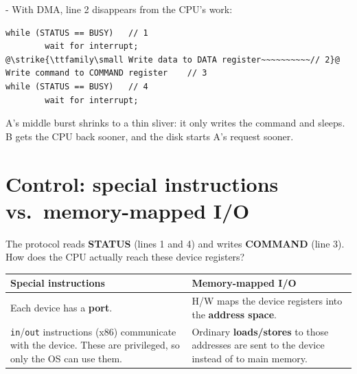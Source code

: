 \documentclass[11pt,a4paper]{article}
\makeatletter
\newcommand{\strike}[1]{\tikz[baseline=(t.base)]{\node[inner sep=0pt] (t) {#1}; \draw[thick] (t.west) -- (t.east);}}
\newcommand{\keepspace}[1]{\par\penalty-100\begingroup
  \setlength{\dimen@}{#1}\dimen@ii\pagegoal\advance\dimen@ii-\pagetotal
  \ifdim\dimen@>\dimen@ii\ifdim\dimen@ii>\z@\vfil\fi\break\fi\endgroup}
\newcommand{\seg}[6]{%
  \draw[fill=#5] (#2,#1) rectangle (#3,{#1+0.45});
  \node[font=\small\bfseries, text=#6] at ({(#2+#3)/2},{#1+0.225}) {#4};}
\newcommand{\rows}[1]{%
  \node[anchor=east, font=\small\bfseries] at (-0.15,0.975) {CPU:};
  \node[anchor=east, font=\small\bfseries] at (-0.15,0.225) {Disk:};
  \draw[-{Latex}, g3] (0,-0.35) -- (#1,-0.35) node[right, font=\scriptsize] {time};}
\newcommand{\A}{g3}\newcommand{\B}{g1}\newcommand{\C}{black!85}
\makeatother
\begin{document}
\keepspace{9\baselineskip}
With DMA, line 2 disappears from the CPU's work:

\begin{lstlisting}[escapechar=@]
while (STATUS == BUSY)   // 1
        wait for interrupt;
@\strike{\ttfamily\small Write data to DATA register~~~~~~~~~~// 2}@
Write command to COMMAND register    // 3
while (STATUS == BUSY)   // 4
        wait for interrupt;
\end{lstlisting}

\begin{center}
\end{center}

A's middle burst shrinks to a thin sliver: it only writes the command and
sleeps. B gets the CPU back sooner, and the disk starts A's request
sooner.

\section{Control: special instructions vs.\ memory-mapped I/O}

\begin{quizbox}
The protocol reads \textbf{STATUS} (lines 1 and 4) and writes
\textbf{COMMAND} (line 3). How does the CPU actually reach these device
registers?
\end{quizbox}

\begin{center}
\renewcommand{\arraystretch}{1.25}
\begin{tabularx}{\textwidth}{@{}XX@{}}
  \toprule
  \textbf{Special instructions} & \textbf{Memory-mapped I/O} \\
  \midrule
  Each device has a \textbf{port}. & H/W maps the device registers into the
  \textbf{address space}. \\
  \texttt{in}/\texttt{out} instructions (x86) communicate with the device.
  These are privileged, so only the OS can use them. & Ordinary
  \textbf{loads/stores} to those addresses are sent to the device instead of
  to main memory. \\
  \bottomrule
\end{tabularx}
\end{center}
\end{document}
